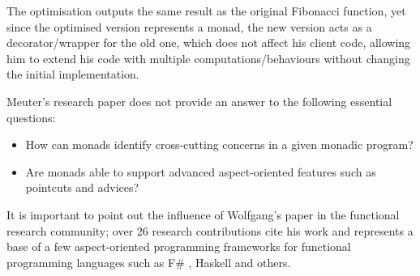 \documentclass[twocolumn, 9pt]{article}
\begin{document}
The optimisation outputs the same result as the original Fibonacci function, yet since the optimised version represents a monad, the new version acts as a decorator/wrapper for the old one, which does not affect his client code, allowing him to extend his code with multiple computations/behaviours without changing the initial implementation.

Meuter's research paper does not provide an answer to the following essential questions: 
\begin{itemize}
    \item How can monads identify cross-cutting concerns in a given monadic program?
    \item Are monads able to support advanced aspect-oriented features such as pointcuts and advices?
\end{itemize}

It is important to point out the influence of Wolfgang's paper in the functional research community; over 26 research contributions cite his work and represents a base of a few aspect-oriented programming frameworks for functional programming languages such as F\# \cite{frameworkf}, Haskell \cite{haskell} and others.

\printbibliography
\end{document}

